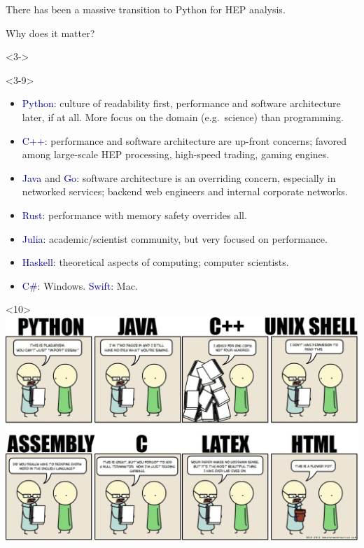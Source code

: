 \documentclass[aspectratio=169]{beamer}
\begin{document}
\begin{frame}{There has been a massive transition to Python for HEP analysis.}
\large
\vspace{0.35 cm}

{\Large Why does it matter?}

\vspace{0.25 cm}

\vspace{0.25 cm}
\begin{uncoverenv}<3->
\begin{onlyenv}<3-9>
\begin{itemize}\setlength{\itemsep}{0.1 cm}
\item<3-> \textcolor{darkblue}{Python}: culture of readability first, performance and software architecture later, if at all. More focus on the domain (e.g.\ science) than programming.
\item<4-> \textcolor{darkblue}{C++}: performance and software architecture are up-front concerns; favored among large-scale HEP processing, high-speed trading, gaming engines.
\item<5-> \textcolor{darkblue}{Java} and \textcolor{darkblue}{Go}: software architecture is an overriding concern, especially in networked services; backend web engineers and internal corporate networks.
\item<6-> \textcolor{darkblue}{Rust}: performance with memory safety overrides all.
\item<7-> \textcolor{darkblue}{Julia}: academic/scientist community, but very focused on performance.
\item<8-> \textcolor{darkblue}{Haskell}: theoretical aspects of computing; computer scientists.
\item<9-> \textcolor{darkblue}{C\#}: Windows. \textcolor{darkblue}{Swift}: Mac.
\end{itemize}
\end{onlyenv}\begin{onlyenv}<10>
\mbox{ } \hfill \includegraphics[width=0.63\linewidth]{PLOTS/somethingofthatilk-comic.jpg} \hfill \mbox{ }
\end{onlyenv}
\vspace{8 cm}
\end{uncoverenv}
\end{frame}
\end{document}
